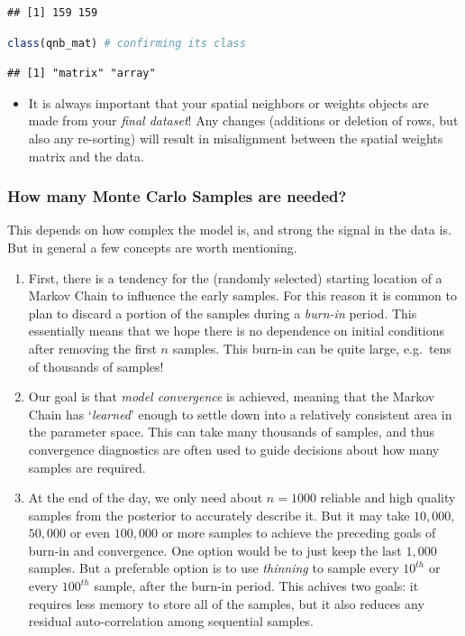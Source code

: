\documentclass[
]{book}
\providecommand{\tightlist}{%
  \setlength{\itemsep}{0pt}\setlength{\parskip}{0pt}}
\newenvironment{rmdblock}[1]
  {%
  \begin{itemize}
  \renewcommand{\labelitemi}{
    \raisebox{-.7\height}[0pt][0pt]{
      {\setkeys{Gin}{width=3em,keepaspectratio}\texttt{[image: images/\#1]}}
    }
  }
  \item
  }
  {
  \end{itemize}
  }
\newenvironment{rmdwarning}
  {\begin{rmdblock}{warning}}
  {\end{rmdblock}}
\begin{document}
\begin{lstlisting}
## [1] 159 159
\end{lstlisting}

\begin{lstlisting}[language=R]
class(qnb_mat) # confirming its class
\end{lstlisting}

\begin{lstlisting}
## [1] "matrix" "array"
\end{lstlisting}

\begin{rmdwarning}
It is always important that your spatial neighbors or weights objects are made from your \emph{final dataset}! Any changes (additions or deletion of rows, but also any re-sorting) will result in misalignment between the spatial weights matrix and the data.
\end{rmdwarning}

\hypertarget{how-many-monte-carlo-samples-are-needed}{%
\subsubsection{How many Monte Carlo Samples are needed?}\label{how-many-monte-carlo-samples-are-needed}}

This depends on how complex the model is, and strong the signal in the data is. But in general a few concepts are worth mentioning.

\begin{enumerate}
\def\labelenumi{\arabic{enumi}.}
\tightlist
\item
  First, there is a tendency for the (randomly selected) starting location of a Markov Chain to influence the early samples. For this reason it is common to plan to discard a portion of the samples during a \emph{burn-in} period. This essentially means that we hope there is no dependence on initial conditions after removing the first \(n\) samples. This burn-in can be quite large, e.g.~tens of thousands of samples!
\item
  Our goal is that \emph{model convergence} is achieved, meaning that the Markov Chain has `\emph{learned}' enough to settle down into a relatively consistent area in the parameter space. This can take many thousands of samples, and thus convergence diagnostics are often used to guide decisions about how many samples are required.
\item
  At the end of the day, we only need about \(n=1000\) reliable and high quality samples from the posterior to accurately describe it. But it may take \(10,000\), \(50,000\) or even \(100,000\) or more samples to achieve the preceding goals of burn-in and convergence. One option would be to just keep the last \(1,000\) samples. But a preferable option is to use \emph{thinning} to sample every \(10^{th}\) or every \(100^{th}\) sample, after the burn-in period. This achives two goals: it requires less memory to store all of the samples, but it also reduces any residual auto-correlation among sequential samples.
\end{enumerate}
\end{document}
